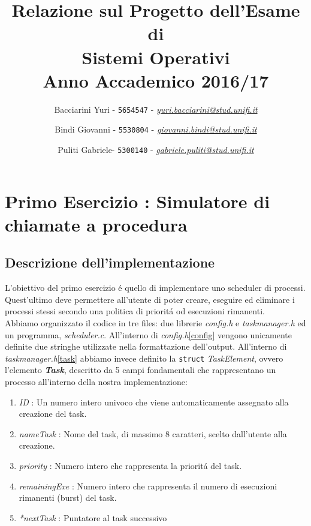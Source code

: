 \documentclass[a4paper]{article}
\begin{document}
 

\title{\vspace{2cm}Relazione sul Progetto dell'Esame di\\ \textbf{Sistemi Operativi}\\ Anno Accademico 2016/17}

\author{Bacciarini Yuri - \texttt{5654547} - \href{mailto:yuri.bacciarini@stud.unifi.it}{\textit{yuri.bacciarini@stud.unifi.it}}
   \and Bindi Giovanni - \texttt{5530804} - \href{mailto:giovanni.bindi@stud.unifi.it}{\textit{giovanni.bindi@stud.unifi.it}}
   \and Puliti Gabriele- \texttt{5300140} - \href{mailto:gabriele.puliti@stud.unifi.it}{\textit{gabriele.puliti@stud.unifi.it}}} 



\maketitle

\newpage
\tableofcontents

\section{Primo Esercizio : Simulatore di chiamate a procedura}
\subsection{Descrizione dell'implementazione}
L'obiettivo del primo esercizio \'e quello di implementare uno scheduler di processi. Quest'ultimo deve permettere all'utente di poter creare, eseguire ed eliminare i processi stessi secondo una politica di priorit\'a od esecuzioni rimanenti. \\
Abbiamo organizzato il codice in tre files: due librerie \textit{config.h} e \textit{taskmanager.h} ed un programma, \textit{scheduler.c}. All'interno di \textit{config.h}\ref{config} vengono unicamente definite due stringhe utilizzate nella formattazione dell'output. All'interno di \textit{taskmanager.h}\ref{task} abbiamo invece definito la \texttt{struct} \textit{TaskElement}, ovvero l'elemento \textbf{\textit{Task}}, descritto da 5 campi fondamentali che rappresentano un processo all'interno della nostra implementazione:

\begin{enumerate}
\item \textit{ID} : Un numero intero univoco che viene automaticamente assegnato alla creazione del task.
\item \textit{nameTask} : Nome del task, di massimo 8 caratteri, scelto dall'utente alla creazione.
\item \textit{priority} : Numero intero che rappresenta la priorit\'a del task.
\item \textit{remainingExe} : Numero intero che rappresenta il numero di esecuzioni rimanenti (burst) del task.
\item \textit{*nextTask} : Puntatore al task successivo
\end{enumerate}
\end{document}
